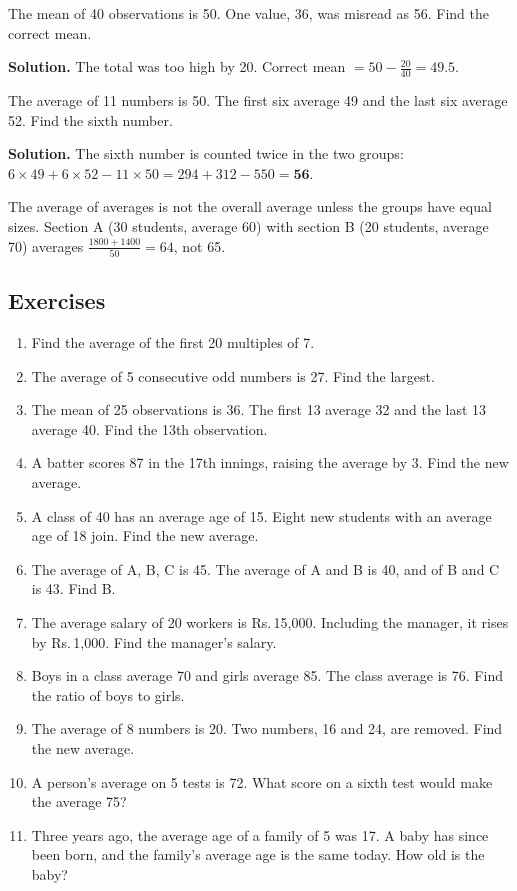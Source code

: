 \documentclass[11pt,a4paper,openany]{report}
\newenvironment{exercises}{\subsection*{Exercises \thechapter}\begin{enumerate}[label=\textbf{\thechapter.\arabic*},leftmargin=3.2em]}{\end{enumerate}}
\newcommand{\Rs}{Rs.\,}
\begin{document}
\begin{example}
The mean of 40 observations is 50. One value, 36, was misread as 56. Find the correct mean.

\textbf{Solution.} The total was too high by 20. Correct mean $=50-\frac{20}{40}=\mathbf{49.5}$.
\end{example}

\begin{example}
The average of 11 numbers is 50. The first six average 49 and the last six average 52. Find the sixth number.

\textbf{Solution.} The sixth number is counted twice in the two groups: $6\times49+6\times52-11\times50=294+312-550=\mathbf{56}$.
\end{example}

\begin{trap}
The average of averages is not the overall average unless the groups have equal sizes. Section A (30 students, average 60) with section B (20 students, average 70) averages $\frac{1800+1400}{50}=64$, not 65.
\end{trap}

\begin{exercises}
\item Find the average of the first 20 multiples of 7.
\item The average of 5 consecutive odd numbers is 27. Find the largest.
\item The mean of 25 observations is 36. The first 13 average 32 and the last 13 average 40. Find the 13th observation.
\item A batter scores 87 in the 17th innings, raising the average by 3. Find the new average.
\item A class of 40 has an average age of 15. Eight new students with an average age of 18 join. Find the new average.
\item The average of A, B, C is 45. The average of A and B is 40, and of B and C is 43. Find B.
\item The average salary of 20 workers is \Rs15,000. Including the manager, it rises by \Rs1,000. Find the manager's salary.
\item Boys in a class average 70 and girls average 85. The class average is 76. Find the ratio of boys to girls.
\item The average of 8 numbers is 20. Two numbers, 16 and 24, are removed. Find the new average.
\item A person's average on 5 tests is 72. What score on a sixth test would make the average 75?
\item Three years ago, the average age of a family of 5 was 17. A baby has since been born, and the family's average age is the same today. How old is the baby?
\end{exercises}
\end{document}
